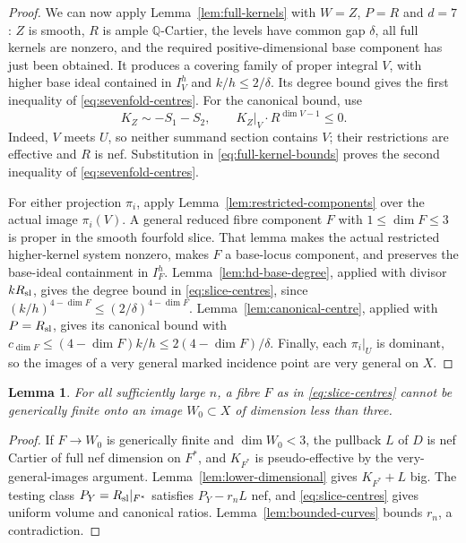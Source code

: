 \documentclass[12pt,a4paper,psamsfonts]{amsart}
\theoremstyle{definition}
\theoremstyle{plain}
\newtheorem{lemma}{Lemma}[section]
\begin{document}
\begin{proof}
We can now apply Lemma~\ref{lem:full-kernels} with $W=Z$, $P=R$
and $d=7$: $Z$ is smooth, $R$ is ample $\mathbb{Q}$-Cartier, the
levels have common gap $\delta$, all full kernels are nonzero,
and the required positive-dimensional base component has just
been obtained. It produces a covering family of proper integral
$V$, with higher base ideal contained in $I_V^h$ and
$k/h\le2/\delta$. Its degree bound gives the first inequality
of \eqref{eq:sevenfold-centres}. For the canonical bound, use
\[
 K_Z\sim-S_1-S_2,\qquad
 K_Z|_V\cdot R^{\dim V-1}\le0.
\]
Indeed, $V$ meets $U$, so neither summand section contains $V$;
their restrictions are effective and $R$ is nef. Substitution
in \eqref{eq:full-kernel-bounds} proves the second inequality
of \eqref{eq:sevenfold-centres}.

For either projection $\pi_i$, apply
Lemma~\ref{lem:restricted-components} over the actual image
$\pi_i(V)$. A general reduced fibre component $F$ with
$1\le\dim F\le3$ is proper in the smooth fourfold slice.
That lemma makes the actual restricted higher-kernel system
nonzero, makes $F$ a base-locus component, and preserves the
base-ideal containment in $I_F^h$.
Lemma~\ref{lem:hd-base-degree}, applied with divisor $kR_{\rm sl}$,
gives the degree bound in \eqref{eq:slice-centres}, since
$(k/h)^{4-\dim F}\le(2/\delta)^{4-\dim F}$.
Lemma~\ref{lem:canonical-centre}, applied with $P=R_{\rm sl}$,
gives its canonical bound with
$c_{\dim F}\le(4-\dim F)k/h\le2(4-\dim F)/\delta$.
Finally, each $\pi_i|_U$ is dominant, so the images of a very
general marked incidence point are very general on $X$.
\end{proof}

\begin{lemma}\label{lem:slice-small-image}
For all sufficiently large $n$, a fibre $F$ as in
\eqref{eq:slice-centres} cannot be generically finite onto an
image $W_0\subset X$ of dimension less than three.
\end{lemma}
\begin{proof}
If $F\to W_0$ is generically finite and $\dim W_0<3$, the
pullback $L$ of $D$ is nef Cartier of full nef dimension on $F^*$,
and $K_{F^*}$ is pseudo-effective by the very-general-images
argument. Lemma~\ref{lem:lower-dimensional} gives $K_{F^*}+L$
big. The testing class $P_Y=R_{\rm sl}|_{F^*}$ satisfies
$P_Y-r_nL$ nef, and \eqref{eq:slice-centres} gives uniform volume
and canonical ratios. Lemma~\ref{lem:bounded-curves} bounds $r_n$,
a contradiction.
\end{proof}
\end{document}
